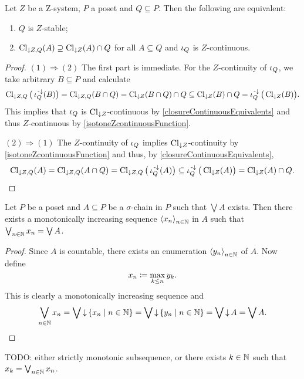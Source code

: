 \begin{lemma} \label{ZstableLemma}
Let $Z$ be a $\mathrm{Z}$-system, $P$ a poset and $Q\subseteq P$. Then the following are equivalent:
\begin{enumerate}
\item $Q$ is $Z$-stable;
\item $\operatorname{Cl}_{\downarrow Z, Q}(A) \supseteq \operatorname{Cl}_{\downarrow Z}(A) \cap Q$ for all $A\subseteq Q$ and $\operatorname{\iota}_Q$ is $Z$-continuous.
\end{enumerate}
\end{lemma}
\begin{proof}
$(1) \Rightarrow (2)$ The first part is immediate. For the $Z$-continuity of $\operatorname{\iota}_Q$, we take arbitrary $B\subseteq P$ and calculate
\[ \operatorname{Cl}_{\downarrow Z, Q}\big(\operatorname{\iota}_Q^{\text{\hspace{0.15em}-}\downarrow}(B)\big) = \operatorname{Cl}_{\downarrow Z, Q}(B\cap Q) = \operatorname{Cl}_{\downarrow Z}(B\cap Q) \cap Q \subseteq \operatorname{Cl}_{\downarrow Z}(B) \cap Q = \operatorname{\iota}_Q^{\text{\hspace{0.15em}-}\downarrow}\big(\operatorname{Cl}_{\downarrow Z}(B)\big). \]
This implies that $\operatorname{\iota}_Q$ is $\operatorname{Cl}_{\downarrow Z}$-continuous by \ref{closureContinuousEquivalents} and thus $Z$-continuous by \ref{isotoneZcontinuousFunction}.

$(2) \Rightarrow (1)$ The $Z$-continuity of $\operatorname{\iota}_Q$ implies $\operatorname{Cl}_{\downarrow Z}$-continuity by \ref{isotoneZcontinuousFunction} and thus, by \ref{closureContinuousEquivalents},
\[ \operatorname{Cl}_{\downarrow Z, Q}(A) = \operatorname{Cl}_{\downarrow Z, Q}(A\cap Q) = \operatorname{Cl}_{\downarrow Z, Q}\big(\operatorname{\iota}_Q^{\text{\hspace{0.15em}-}\downarrow}(A)\big) \subseteq \operatorname{\iota}_Q^{\text{\hspace{0.15em}-}\downarrow}\big(\operatorname{Cl}_{\downarrow Z}(A)\big) = \operatorname{Cl}_{\downarrow Z}(A) \cap Q. \]
\end{proof}

\begin{lemma} \label{monotoneSequenceLemma}
Let $P$ be a poset and $A\subseteq P$ be a $\sigma$-chain in $P$ such that $\bigvee A$ exists. Then there exists a monotonically increasing sequence $\left\langle x_n \right\rangle_{n\in \mathbb{N}}$ in $A$ such that $\bigvee_{n\in \mathbb{N}} x_n = \bigvee A$.
\end{lemma}
\begin{proof}
Since $A$ is countable, there exists an enumeration $\left\langle y_n \right\rangle_{n\in \mathbb{N}}$ of $A$. Now define
\[ x_n \coloneqq \max_{k\leq n} y_k. \]
This is clearly a monotonically increasing sequence and
\[ \bigvee_{n\in \N} x_n = \bigvee \downset \setbuilder{x_n}{n\in \N} = \bigvee \downset \setbuilder{y_n}{n\in \N} = \bigvee \downset A = \bigvee A. \]
\end{proof}

TODO: either strictly monotonic subsequence, or there exists $k\in \mathbb{N}$ such that $x_k = \bigvee_{n\in \mathbb{N}}x_n$.

